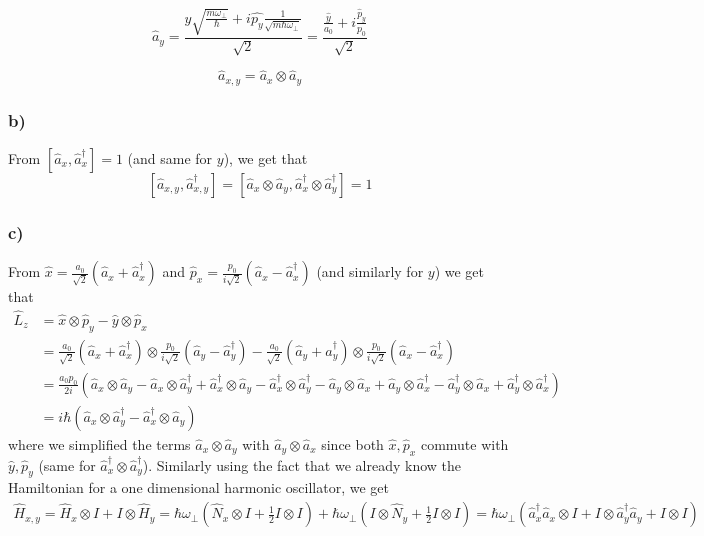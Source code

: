 \documentclass[10pt,a4paper]{book}
\begin{document}
$$\hat{a}_y=\frac{\hat{y}\sqrt{\frac{m\omega_{\perp}}{\hbar}}+i\hat{p_y}\frac{1}{\sqrt{m\hbar\omega_{\perp}}}}{\sqrt{2}}=\frac{\frac{\hat{y}}{a_0}+i\frac{\hat{p}_y}{p_0}}{\sqrt{2}}$$

$$\hat{a}_{x,y}=\hat{a}_x\otimes\hat{a}_y$$

\subsubsection*{b)}
From $[\hat{a}_x,\hat{a}^{\dagger}_x]=1$ (and same for $y$), we get that 
$$[\hat{a}_{x,y},\hat{a}^{\dagger}_{x,y}]=[\hat{a}_x\otimes\hat{a}_y,\hat{a}^{\dagger}_x\otimes \hat{a}^{\dagger}_y]=1$$

\subsubsection*{c)}

From $\hat{x}=\frac{a_0}{\sqrt{2}}(\hat{a}_x+\hat{a}^{\dagger}_x)$ and $\hat{p}_x=\frac{p_0}{i\sqrt{2}}(\hat{a}_x-\hat{a}^{\dagger}_x)$ (and similarly for $y$) we get that
\begin{align*}
\hat{L}_z&=\hat{x}\otimes \hat{p}_y-\hat{y}\otimes\hat{p}_x\\
&=\frac{a_0}{\sqrt{2}}(\hat{a}_x+\hat{a}^{\dagger}_x)\otimes \frac{p_0}{i\sqrt{2}}(\hat{a}_y-\hat{a}^{\dagger}_y)-\frac{a_0}{\sqrt{2}}(\hat{a}_y+\hat{a}^{\dagger}_y)\otimes \frac{p_0}{i\sqrt{2}}(\hat{a}_x-\hat{a}^{\dagger}_x)\\
&=\frac{a_0p_0}{2i}(\hat{a}_x\otimes \hat{a}_y-\hat{a}_x\otimes \hat{a}_y^{\dagger}+\hat{a}_x^{\dagger}\otimes \hat{a}_y-\hat{a}_x^{\dagger}\otimes \hat{a}_y^{\dagger}-\hat{a}_y\otimes \hat{a}_x+\hat{a}_y\otimes \hat{a}_x^{\dagger}-\hat{a}_y^{\dagger}\otimes \hat{a}_x+\hat{a}_y^{\dagger}\otimes \hat{a}_x^{\dagger})\\
&=i\hbar(\hat{a}_x\otimes \hat{a}_y^{\dagger}-\hat{a}^{\dagger}_x\otimes \hat{a}_y)
\end{align*}
where we simplified the terms $\hat{a}_x\otimes \hat{a}_y$ with $\hat{a}_y\otimes \hat{a}_x$ since both $\hat{x},\hat{p}_x$ commute with $\hat{y},\hat{p}_y$ (same for $\hat{a}_x^{\dagger}\otimes \hat{a}_y^{\dagger}$).
Similarly using the fact that we already know the Hamiltonian for a one dimensional harmonic oscillator, we get
\begin{align*}
\hat{H}_{x,y}=\hat{H}_x\otimes I+I\otimes\hat{H}_y=\hbar\omega_{\perp}(\hat{N}_x\otimes I+\frac{1}{2}I\otimes I)+\hbar\omega_{\perp}(I\otimes \hat{N}_y+\frac{1}{2} I\otimes I)=\hbar\omega_{\perp}(\hat{a}_x^{\dagger}\hat{a}_x\otimes I+I\otimes \hat{a}_y^{\dagger}\hat{a}_y +I\otimes I)
\end{align*}
\end{document}
